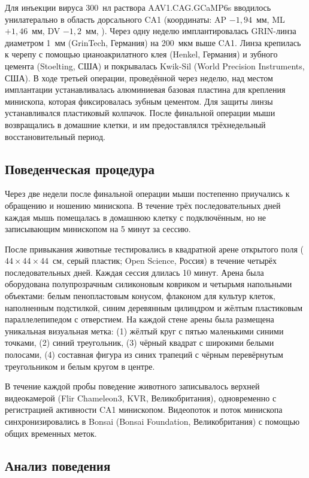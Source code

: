 Для инъекции вируса 300~нл раствора AAV1.CAG.GCaMP6s вводилось унилатерально в область дорсального CA1 (координаты: AP $-1{,}94$~мм, ML $+1{,}46$~мм, DV $-1{,}2$~мм, \cite{Paxinos2019}). Через одну неделю имплантировалась GRIN-линза диаметром 1~мм (GrinTech, Германия) на 200~мкм выше CA1. Линза крепилась к черепу с помощью цианоакрилатного клея (Henkel, Германия) и зубного цемента (Stoelting, США) и покрывалась Kwik-Sil (World Precision Instruments, США). В ходе третьей операции, проведённой через неделю, над местом имплантации устанавливалась алюминиевая базовая пластина для крепления минископа, которая фиксировалась зубным цементом. Для защиты линзы устанавливался пластиковый колпачок. После финальной операции мыши возвращались в домашние клетки, и им предоставлялся трёхнедельный восстановительный период.

\subsection{Поведенческая процедура}

Через две недели после финальной операции мыши постепенно приучались к обращению и ношению минископа. В течение трёх последовательных дней каждая мышь помещалась в домашнюю клетку с подключённым, но не записывающим минископом на 5 минут за сессию.

После привыкания животные тестировались в квадратной арене открытого поля ($44 \times 44 \times 44$~см, серый пластик; Open Science, Россия) в течение четырёх последовательных дней. Каждая сессия длилась 10 минут. Арена была оборудована полупрозрачным силиконовым ковриком и четырьмя напольными объектами: белым пенопластовым конусом, флаконом для культур клеток, наполненным подстилкой, синим деревянным цилиндром и жёлтым пластиковым параллелепипедом с отверстием. На каждой стене арены была размещена уникальная визуальная метка: (1) жёлтый круг с пятью маленькими синими точками, (2) синий треугольник, (3) чёрный квадрат с широкими белыми полосами, (4) составная фигура из синих трапеций с чёрным перевёрнутым треугольником и белым кругом в центре.

В течение каждой пробы поведение животного записывалось верхней видеокамерой (Flir Chameleon3, KVR, Великобритания), одновременно с регистрацией активности CA1 минископом. Видеопоток и поток минископа синхронизировались в Bonsai (Bonsai Foundation, Великобритания) с помощью общих временных меток.

\subsection{Анализ поведения}

